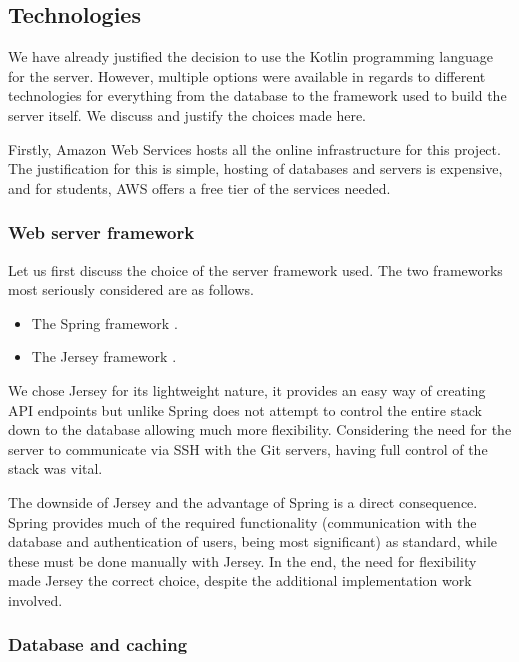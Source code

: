 \subsection{Technologies}\label{sec:technologies}

We have already justified the decision to use the Kotlin programming language for the server. However, multiple options were available in regards to different technologies for everything from the database to the framework used to build the server itself. We discuss and justify the choices made here.

Firstly, Amazon Web Services hosts all the online infrastructure for this project. The justification for this is simple, hosting of databases and servers is expensive, and for students, AWS offers a free tier of the services needed.

\subsubsection{Web server framework}

Let us first discuss the choice of the server framework used. The two frameworks most seriously considered are as follows.

\begin{itemize}
\item The Spring framework \cite{spring}.
\item The Jersey framework \cite{jersey}.
\end{itemize}

We chose Jersey for its lightweight nature, it provides an easy way of creating API endpoints but unlike Spring does not attempt to control the entire stack down to the database allowing much more flexibility. Considering the need for the server to communicate via SSH with the Git servers, having full control of the stack was vital.

The downside of Jersey and the advantage of Spring is a direct consequence. Spring provides much of the required functionality (communication with the database and authentication of users, being most significant) as standard, while these must be done manually with Jersey. In the end, the need for flexibility made Jersey the correct choice, despite the additional implementation work involved.

\subsubsection{Database and caching}

